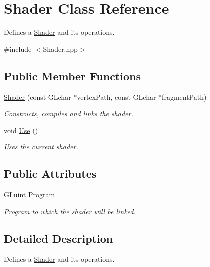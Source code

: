 \hypertarget{class_shader}{}\section{Shader Class Reference}
\label{class_shader}


Defines a \hyperlink{class_shader}{Shader} and it\textquotesingle{}s operations.  




{\ttfamily \#include $<$Shader.\+hpp$>$}

\subsection*{Public Member Functions}
\begin{DoxyCompactItemize}
\item 
\hyperlink{class_shader_a03421a8419cdad4b84cf58ecdb156879}{Shader} (const G\+Lchar $\ast$vertex\+Path, const G\+Lchar $\ast$fragment\+Path)
\begin{DoxyCompactList}\small\item\em Constructs, compiles and links the shader. \end{DoxyCompactList}\item 
\hypertarget{class_shader_a6b11327cff651ffdb22988b6917b1650}{}\label{class_shader_a6b11327cff651ffdb22988b6917b1650} 
void \hyperlink{class_shader_a6b11327cff651ffdb22988b6917b1650}{Use} ()
\begin{DoxyCompactList}\small\item\em Uses the current shader. \end{DoxyCompactList}\end{DoxyCompactItemize}
\subsection*{Public Attributes}
\begin{DoxyCompactItemize}
\item 
\hypertarget{class_shader_a51b23253846bc84dcc2ef06612679012}{}\label{class_shader_a51b23253846bc84dcc2ef06612679012} 
G\+Luint \hyperlink{class_shader_a51b23253846bc84dcc2ef06612679012}{Program}
\begin{DoxyCompactList}\small\item\em Program to which the shader will be linked. \end{DoxyCompactList}\end{DoxyCompactItemize}


\subsection{Detailed Description}
Defines a \hyperlink{class_shader}{Shader} and it\textquotesingle{}s operations. 

